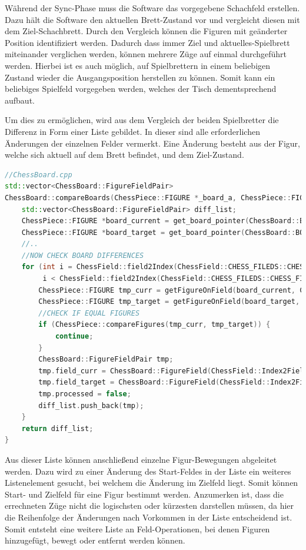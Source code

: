 Während der Sync-Phase muss die Software das vorgegebene Schachfeld
erstellen. Dazu hält die Software den aktuellen Brett-Zustand vor und
vergleicht diesen mit dem Ziel-Schachbrett. Durch den Vergleich können
die Figuren mit geänderter Position identifiziert werden. Dadurch dass
immer Ziel und aktuelles-Spielbrett miteinander verglichen werden,
können mehrere Züge auf einmal durchgeführt werden. Hierbei ist es auch
möglich, auf Spielbrettern in einem beliebigen Zustand wieder die
Ausgangsposition herstellen zu können. Somit kann ein beliebiges
Spielfeld vorgegeben werden, welches der Tisch dementsprechend aufbaut.

Um dies zu ermöglichen, wird aus dem Vergleich der beiden Spielbretter
die Differenz in Form einer Liste gebildet. In dieser sind alle
erforderlichen Änderungen der einzelnen Felder vermerkt. Eine Änderung
besteht aus der Figur, welche sich aktuell auf dem Brett befindet, und
dem Ziel-Zustand.

\begin{lstlisting}[language={C++}]
//ChessBoard.cpp
std::vector<ChessBoard::FigureFieldPair>
ChessBoard::compareBoards(ChessPiece::FIGURE *_board_a, ChessPiece::FIGURE *_board_b, bool _include_park_pos) {
    std::vector<ChessBoard::FigureFieldPair> diff_list;
    ChessPiece::FIGURE *board_current = get_board_pointer(ChessBoard::BOARD_TPYE::REAL_BOARD);
    ChessPiece::FIGURE *board_target = get_board_pointer(ChessBoard::BOARD_TPYE::TARGET_BOARD);
    //..
    //NOW CHECK BOARD DIFFERENCES
    for (int i = ChessField::field2Index(ChessField::CHESS_FILEDS::CHESS_FIELD_A1);
         i < ChessField::field2Index(ChessField::CHESS_FILEDS::CHESS_FIELD_PARK_POSTION_WHITE_1); i++) {
        ChessPiece::FIGURE tmp_curr = getFigureOnField(board_current, ChessField::Index2Field(i));
        ChessPiece::FIGURE tmp_target = getFigureOnField(board_target, ChessField::Index2Field(i));
        //CHECK IF EQUAL FIGURES
        if (ChessPiece::compareFigures(tmp_curr, tmp_target)) {
            continue;
        }
        ChessBoard::FigureFieldPair tmp;
        tmp.field_curr = ChessBoard::FigureField(ChessField::Index2Field(i), tmp_curr);
        tmp.field_target = ChessBoard::FigureField(ChessField::Index2Field(i), tmp_target);
        tmp.processed = false;
        diff_list.push_back(tmp);
    }
    return diff_list;
}
\end{lstlisting}

Aus dieser Liste können anschließend einzelne Figur-Bewegungen
abgeleitet werden. Dazu wird zu einer Änderung des Start-Feldes in der
Liste ein weiteres Listenelement gesucht, bei welchem die Änderung im
Zielfeld liegt. Somit können Start- und Zielfeld für eine Figur bestimmt
werden. Anzumerken ist, dass die errechneten Züge nicht die logischsten
oder kürzesten darstellen müssen, da hier die Reihenfolge der Änderungen
nach Vorkommen in der Liste entscheidend ist. Somit entsteht eine
weitere Liste an Feld-Operationen, bei denen Figuren hinzugefügt, bewegt
oder entfernt werden können.

